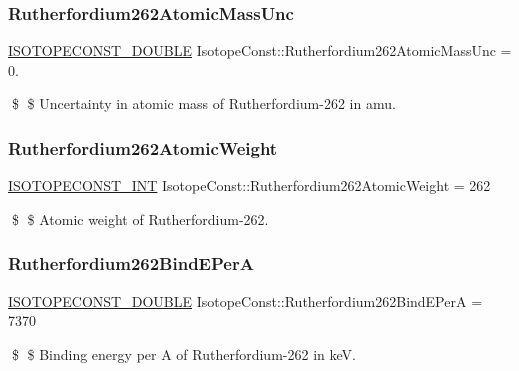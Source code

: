 \subsubsection{\texorpdfstring{Rutherfordium262\+Atomic\+Mass\+Unc}{Rutherfordium262AtomicMassUnc}}
{\footnotesize\ttfamily \mbox{\hyperlink{group___isotope_const-_macros_ga8f45a7272ce02c0b4c65c44636ed719a}{I\+S\+O\+T\+O\+P\+E\+C\+O\+N\+S\+T\+\_\+\+D\+O\+U\+B\+LE}} Isotope\+Const\+::\+Rutherfordium262\+Atomic\+Mass\+Unc = 0.}

\$ \$ Uncertainty in atomic mass of Rutherfordium-\/262 in amu. \mbox{\label{group___isotope_const-_rutherfordium-_rf262_ga98b69e1c2d0282d90726aa6ea8dd53b4}} 
\subsubsection{\texorpdfstring{Rutherfordium262\+Atomic\+Weight}{Rutherfordium262AtomicWeight}}
{\footnotesize\ttfamily \mbox{\hyperlink{group___isotope_const-_macros_ga5f18360b3e99483a35c32d789e62621c}{I\+S\+O\+T\+O\+P\+E\+C\+O\+N\+S\+T\+\_\+\+I\+NT}} Isotope\+Const\+::\+Rutherfordium262\+Atomic\+Weight = 262}

\$ \$ Atomic weight of Rutherfordium-\/262. \mbox{\label{group___isotope_const-_rutherfordium-_rf262_ga65f0583dd8b5d4a4f74ce896cab3015c}} 
\subsubsection{\texorpdfstring{Rutherfordium262\+Bind\+E\+PerA}{Rutherfordium262BindEPerA}}
{\footnotesize\ttfamily \mbox{\hyperlink{group___isotope_const-_macros_ga8f45a7272ce02c0b4c65c44636ed719a}{I\+S\+O\+T\+O\+P\+E\+C\+O\+N\+S\+T\+\_\+\+D\+O\+U\+B\+LE}} Isotope\+Const\+::\+Rutherfordium262\+Bind\+E\+PerA = 7370}

\$ \$ Binding energy per A of Rutherfordium-\/262 in keV. \mbox{\label{group___isotope_const-_rutherfordium-_rf262_gaf383af91eb88df5b21c7ec7d3b70b0a7}} 

